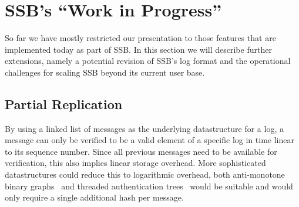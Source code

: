 \documentclass[9pt,sigconf]{acmart}
\begin{document}


\section{SSB's ``Work in Progress''}
\label{sec:wip}

So far we have mostly restricted our presentation to those features that are implemented today as part of SSB. In this section we will describe further extensions, namely a potential revision of SSB's log format and the operational challenges for scaling SSB beyond its current user base. %


\subsection{Partial Replication}

By using a linked list of messages as the underlying datastructure for a log, a message can only be verified to be a valid element of a specific log in time linear to its sequence number. Since all previous messages need to be available for verification, this also implies linear storage overhead. More sophisticated datastructures could reduce this to logarithmic overhead, both anti-monotone binary graphs~\cite{buldas1998new} and threaded authentication trees~\cite{buldas2000optimally} would be suitable and would only require a single additional hash per message.
\end{document}
